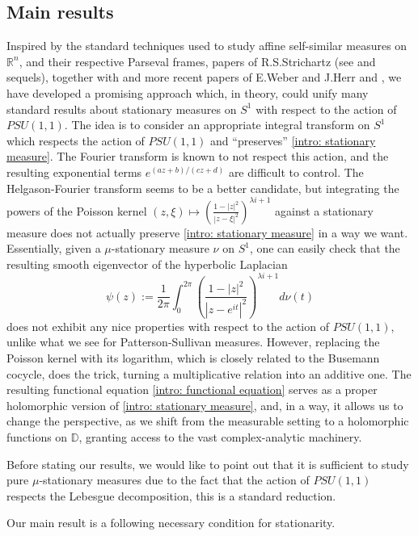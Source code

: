 \documentclass[11pt]{article}
\begin{document}
\subsection{Main results}
Inspired by the standard techniques used to study affine self-similar measures on $\mathbb{R}^n$, and their respective Parseval frames, papers of R.S.Strichartz (see \cite{strichartzI} and sequels), together with \cite{denseanalytic} and more recent papers of E.Weber and J.Herr \cite{weber2017paleywiener} and \cite{axioms6020007}, we have developed a promising approach which, in theory, could unify many standard results about stationary measures on $S^1$ with respect to the action of $PSU(1,1)$. The idea is to consider an appropriate integral transform on $S^1$ which respects the action of $PSU(1,1)$ and ``preserves'' \eqref{intro: stationary measure}. The Fourier transform is known to not respect this action, and the resulting exponential terms $e^{(az +b) / (cz+d)}$ are difficult to control. The Helgason-Fourier transform seems to be a better candidate, but integrating the powers of the Poisson kernel $(z, \xi) \mapsto \left( \frac{1 - |z|^2}{|z - \xi|^2}\right)^{\lambda i + 1}$ against a stationary measure does not actually preserve \eqref{intro: stationary measure} in a way we want. Essentially, given a $\mu$-stationary measure $\nu$ on $S^1$, one can easily check that the resulting smooth eigenvector of the hyperbolic Laplacian
\[
\psi(z) := \frac{1}{2\pi} \int_{0}^{2\pi} \left( \frac{1 - |z|^2}{|z - e^{i t}|^2}\right)^{\lambda i + 1} d\nu(t)
\]
does not exhibit any nice properties with respect to the action of $PSU(1,1)$, unlike what we see for Patterson-Sullivan measures. However, replacing the Poisson kernel with its logarithm, which is closely related to the Busemann cocycle, does the trick, turning a multiplicative relation into an additive one. The resulting functional equation \eqref{intro: functional equation} serves as a proper holomorphic version of \eqref{intro: stationary measure}, and, in a way, it allows us to change the perspective, as we shift from the measurable setting to a holomorphic functions on $\mathbb{D}$, granting access to the vast complex-analytic machinery.

Before stating our results, we would like to point out that it is sufficient to study pure $\mu$-stationary measures due to the fact that the action of $PSU(1,1)$ respects the Lebesgue decomposition, this is a standard reduction.

Our main result is a following necessary condition for stationarity.
\end{document}
